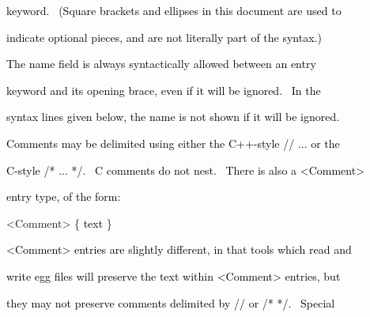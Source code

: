 \documentclass[a4paper]{article}
\newcommand\textstyleOOoComputerKeyWord[1]{\textrm{\textcolor[rgb]{0.0,0.0,0.5019608}{#1}}}
\newcommand\textstyleOOoAssemblerSpecialChar[1]{\textrm{\textcolor[rgb]{0.0,0.5019608,0.0}{#1}}}
\newcommand\textstyleOOoAssemblerIdent[1]{\textrm{\textcolor{black}{#1}}}
\newcommand\textstyleOOoAssemblerDirective[1]{\textrm{\textcolor[rgb]{0.0,0.5019608,1.0}{#1}}}
\begin{document}
{\color{black}
\textstyleOOoComputerKeyWord{\textcolor{black}{keyword. \ (Square brackets and ellipses in this document are used to}}}

{\color{black}
\textstyleOOoComputerKeyWord{\textcolor{black}{indicate optional pieces, and are not literally part of the syntax.)}}}


\bigskip

{\color{black}
\textstyleOOoComputerKeyWord{\textcolor{black}{The name field is always syntactically allowed between an entry}}}

{\color{black}
\textstyleOOoComputerKeyWord{\textcolor{black}{keyword and its opening brace, even if it will be ignored. \ In the}}}

{\color{black}
\textstyleOOoComputerKeyWord{\textcolor{black}{syntax lines given below, the name is not shown if it will be ignored.}}}


\bigskip

{\color{black}
\textstyleOOoComputerKeyWord{\textcolor{black}{Comments may be delimited using either the C++-style // ... or the}}}

{\color{black}
\textstyleOOoComputerKeyWord{\textcolor{black}{C-style /* ... */. \ C comments do not nest. \ There is also a
{\textless}Comment{\textgreater}}}}

{\color{black}
\textstyleOOoComputerKeyWord{\textcolor{black}{entry type, of the form:}}}


\bigskip

{\color{black}
\textstyleOOoAssemblerSpecialChar{{\textless}}\textstyleOOoAssemblerDirective{Comment}\textstyleOOoAssemblerSpecialChar{{\textgreater}}\textstyleOOoComputerKeyWord{\textcolor{black}{
}}\textstyleOOoAssemblerSpecialChar{\{}\textstyleOOoComputerKeyWord{\textcolor{black}{
}}\textstyleOOoAssemblerIdent{text}\textstyleOOoComputerKeyWord{\textcolor{black}{
}}\textstyleOOoAssemblerSpecialChar{\}}}


\bigskip

{\color{black}
\textstyleOOoComputerKeyWord{\textcolor{black}{{\textless}Comment{\textgreater} entries are slightly different, in that
tools which read and}}}

{\color{black}
\textstyleOOoComputerKeyWord{\textcolor{black}{write egg files will preserve the text within
{\textless}Comment{\textgreater} entries, but}}}

{\color{black}
\textstyleOOoComputerKeyWord{\textcolor{black}{they may not preserve comments delimited by // or /* */. \ Special}}}
\end{document}
